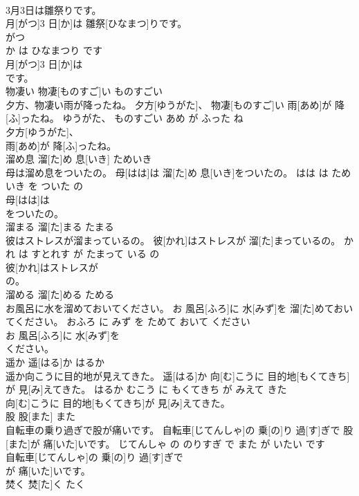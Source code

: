 \documentclass[8pt]{extreport}
\begin{document}
\begin{CJK}{UTF8}{min}
\\	3月3日は雛祭りです。	
\\	月[がつ]3 日[か]は 雛祭[ひなまつ]りです。	
\\	がつ 
\\	か は ひなまつり です	
\\	月[がつ]3 日[か]は
\\	です。			
\\	物凄い	物凄[ものすご]い	ものすごい	
\\	夕方、物凄い雨が降ったね。	夕方[ゆうがた]、 物凄[ものすご]い 雨[あめ]が 降[ふ]ったね。	ゆうがた、 ものすごい あめ が ふった ね	
\\	夕方[ゆうがた]、
\\	雨[あめ]が 降[ふ]ったね。			
\\	溜め息	溜[た]め 息[いき]	ためいき	
\\	母は溜め息をついたの。	母[はは]は 溜[た]め 息[いき]をついたの。	はは は ためいき を ついた の	
\\	母[はは]は
\\	をついたの。			
\\	溜まる	溜[た]まる	たまる	
\\	彼はストレスが溜まっているの。	彼[かれ]はストレスが 溜[た]まっているの。	かれ は すとれす が たまって いる の	
\\	彼[かれ]はストレスが
\\	の。			
\\	溜める	溜[た]める	ためる	
\\	お風呂に水を溜めておいてください。	お 風呂[ふろ]に 水[みず]を 溜[た]めておいてください。	おふろ に みず を ためて おいて ください	
\\	お 風呂[ふろ]に 水[みず]を
\\	ください。			
\\	遥か	遥[はる]か	はるか	
\\	遥か向こうに目的地が見えてきた。	遥[はる]か 向[む]こうに 目的地[もくてきち]が 見[み]えてきた。	はるか むこう に もくてきち が みえて きた	
\\	向[む]こうに 目的地[もくてきち]が 見[み]えてきた。			
\\	股	股[また]	また	
\\	自転車の乗り過ぎで股が痛いです。	自転車[じてんしゃ]の 乗[の]り 過[す]ぎで 股[また]が 痛[いた]いです。	じてんしゃ の のりすぎ で また が いたい です	
\\	自転車[じてんしゃ]の 乗[の]り 過[す]ぎで
\\	が 痛[いた]いです。			
\\	焚く	焚[た]く	たく	

\end{CJK}
\end{document}

